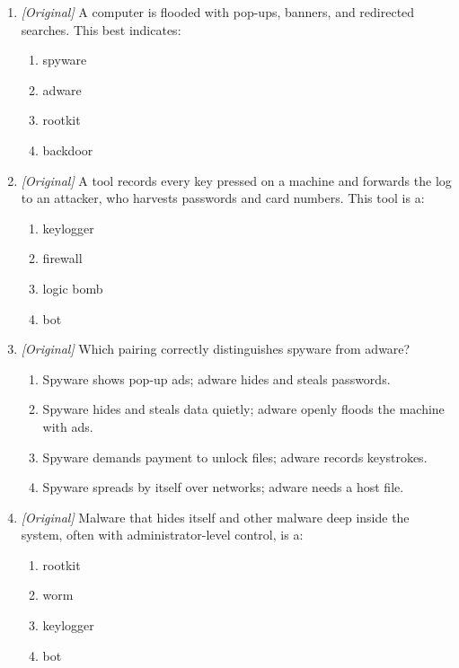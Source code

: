 \documentclass[11pt]{article}
\begin{document}
\begin{enumerate}[label=\textbf{Q\arabic*.}, leftmargin=*]
\begin{enumerate}[label=\Alph*.]
    \item Adware
    \item Spyware
    \item Logic bomb
    \item Bot
  \end{enumerate}
\item \textit{[Original]} A computer is flooded with pop-ups, banners, and
  redirected searches. This best indicates:
  \begin{enumerate}[label=\Alph*.]
    \item spyware
    \item adware
    \item rootkit
    \item backdoor
  \end{enumerate}
\item \textit{[Original]} A tool records every key pressed on a machine and
  forwards the log to an attacker, who harvests passwords and card numbers.
  This tool is a:
  \begin{enumerate}[label=\Alph*.]
    \item keylogger
    \item firewall
    \item logic bomb
    \item bot
  \end{enumerate}
\item \textit{[Original]} Which pairing correctly distinguishes spyware from
  adware?
  \begin{enumerate}[label=\Alph*.]
    \item Spyware shows pop-up ads; adware hides and steals passwords.
    \item Spyware hides and steals data quietly; adware openly floods the
      machine with ads.
    \item Spyware demands payment to unlock files; adware records
      keystrokes.
    \item Spyware spreads by itself over networks; adware needs a host file.
  \end{enumerate}
\item \textit{[Original]} Malware that hides itself and other malware deep
  inside the system, often with administrator-level control, is a:
  \begin{enumerate}[label=\Alph*.]
    \item rootkit
    \item worm
    \item keylogger
    \item bot

\end{enumerate}
\end{enumerate}
\end{document}
